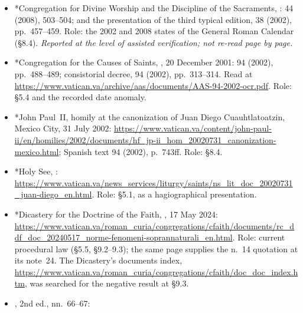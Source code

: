 \begin{itemize}
Sacraments, Prot.~803/99/L, decree , 25 March 1999:  35 (1999), 394--395,
pp.~272--274, read from rendered page images of the Dicastery's scan,
\url{https://www.cultodivino.va/content/dam/cultodivino/rivista-notitiae/1990/notitiae-35-(1999)/Notitiae-394-395-1999.pdf}.
Role: \S8.4.
\item *Congregation for Divine Worship and the Discipline of the
Sacraments, :  44
(2008), 503--504; and the presentation of the third typical edition,
 38 (2002), pp.~457--459. Role: the 2002 and 2008
states of the General Roman Calendar (\S8.4). \emph{Reported at the
level of assisted verification; not re-read page by page.}
\item *Congregation for the Causes of Saints, , 20 December 2001:  94 (2002),
pp.~488--489; consistorial decree,  94 (2002),
pp.~313--314. Read at
\url{https://www.vatican.va/archive/aas/documents/AAS-94-2002-ocr.pdf}.
Role: \S5.4 and the recorded date anomaly.
\item *John Paul~II, homily at the canonization of Juan Diego
Cuauhtlatoatzin, Mexico City, 31 July 2002:
\url{https://www.vatican.va/content/john-paul-ii/en/homilies/2002/documents/hf_jp-ii_hom_20020731_canonization-mexico.html};
Spanish text  94 (2002), p.~743ff. Role: \S8.4.
\item *Holy See, :
\url{https://www.vatican.va/news_services/liturgy/saints/ns_lit_doc_20020731_juan-diego_en.html}.
Role: \S5.1, as a hagiographical presentation.
\item *Dicastery for the Doctrine of the Faith, , 17
May 2024:
\url{https://www.vatican.va/roman_curia/congregations/cfaith/documents/rc_ddf_doc_20240517_norme-fenomeni-soprannaturali_en.html}.
Role: current procedural law (\S5.5, \S9.2--9.3); the same page
supplies the  n.~14 quotation at its note~24. The
Dicastery's documents index,
\url{https://www.vatican.va/roman_curia/congregations/cfaith/doc_doc_index.htm},
was searched for the negative result at \S9.3.
\item {}, 2nd ed., nn.~66--67:

\end{itemize}
